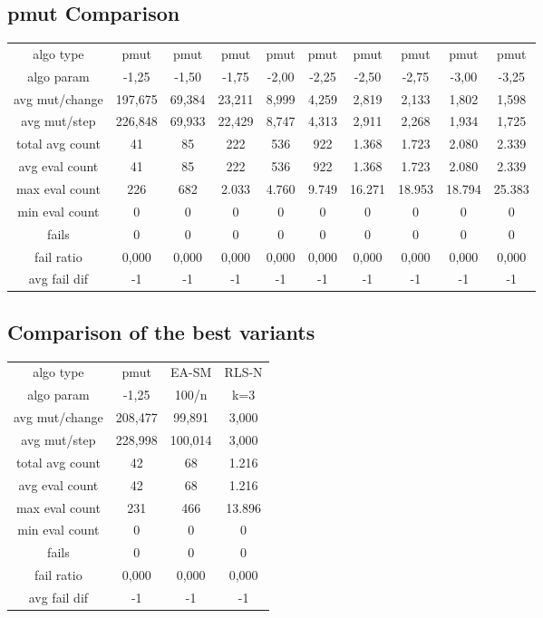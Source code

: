 \subsection{pmut Comparison}
\begin{tabular}[h]{cccccccccc}
algo type&           pmut&    pmut&    pmut&    pmut&    pmut&    pmut&    pmut&    pmut&    pmut\\
algo param&         -1,25&   -1,50&   -1,75&   -2,00&   -2,25&   -2,50&   -2,75&   -3,00&   -3,25\\
avg mut/change&   197,675&  69,384&  23,211&   8,999&   4,259&   2,819&   2,133&   1,802&   1,598\\
avg mut/step&     226,848&  69,933&  22,429&   8,747&   4,313&   2,911&   2,268&   1,934&   1,725\\
\hline
total avg count&       41&      85&     222&     536&     922&   1.368&   1.723&   2.080&   2.339\\
avg eval count&        41&      85&     222&     536&     922&   1.368&   1.723&   2.080&   2.339\\
max eval count&       226&     682&   2.033&   4.760&   9.749&  16.271&  18.953&  18.794&  25.383\\
min eval count&         0&       0&       0&       0&       0&       0&       0&       0&       0\\
\hline
fails&                  0&       0&       0&       0&       0&       0&       0&       0&       0\\
fail ratio&         0,000&   0,000&   0,000&   0,000&   0,000&   0,000&   0,000&   0,000&   0,000\\
avg fail dif&          -1&      -1&      -1&      -1&      -1&      -1&      -1&      -1&      -1\\
\end{tabular}
\subsection{Comparison of the best variants}
\begin{tabular}[h]{cccc}
algo type&           pmut&   EA-SM&   RLS-N\\
algo param&         -1,25&   100/n&     k=3\\
avg mut/change&   208,477&  99,891&   3,000\\
avg mut/step&     228,998& 100,014&   3,000\\
\hline
total avg count&       42&      68&   1.216\\
avg eval count&        42&      68&   1.216\\
max eval count&       231&     466&  13.896\\
min eval count&         0&       0&       0\\
\hline
fails&                  0&       0&       0\\
fail ratio&         0,000&   0,000&   0,000\\
avg fail dif&          -1&      -1&      -1\\
\end{tabular}
